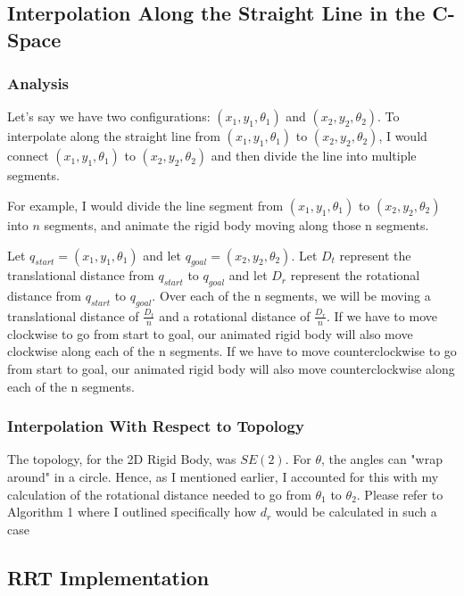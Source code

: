 \documentclass{article}
\begin{document}
\subsection{Interpolation Along the Straight Line in the C-Space}
\subsubsection{Analysis}
Let's say we have two configurations: $(x_1, y_1, \theta_1)$ and $(x_2, y_2, \theta_2)$. To interpolate along the straight line from $(x_1, y_1, \theta_1)$ to  $(x_2, y_2, \theta_2)$, I would connect $(x_1, y_1, \theta_1)$ to  $(x_2, y_2, \theta_2)$ and then divide the line into multiple segments. \newline 

For example, I would divide the line segment from $(x_1, y_1, \theta_1)$ to  $(x_2, y_2, \theta_2)$ into $n$ segments, and animate the rigid body moving along those n segments. 

Let $q_{start} = (x_1, y_1, \theta_1)$ and let $q_{goal} = (x_2, y_2, \theta_2)$. Let $D_t$ represent the translational distance from $q_{start}$ to $q_{goal}$ and let $D_r$ represent the rotational distance from $q_{start}$ to $q_{goal}$. Over each of the n segments, we will be moving a translational distance of $\frac{D_t}{n}$ and a rotational distance of $\frac{D_r}{n}$. If we have to move clockwise to go from start to goal, our animated rigid body will also move clockwise along each of the n segments.  If we have to move counterclockwise to go from start to goal, our animated rigid body will also move counterclockwise along each of the n segments. 

\subsubsection{Interpolation With Respect to Topology}
The topology, for the 2D Rigid Body, was $SE(2)$. For $\theta$, the angles can "wrap around" in a circle. Hence, as I mentioned earlier, I accounted for this with my calculation of the rotational distance needed to go from $\theta_1$ to $\theta_2$. Please refer to Algorithm 1 where I outlined specifically how $d_r$ would be calculated in such a case 

\newpage 
\subsection{RRT Implementation}
\end{document}
